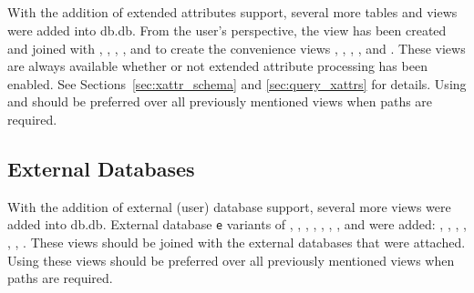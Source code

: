 \subsection{\xattrs}
With the addition of extended attributes support, several more tables
and views were added into db.db. From the user's perspective, the
\xattrs view has been created and joined with \entries, \pentries,
\summary, \vrpentries, and \vrsummary to create the convenience views
\xentries, \xpentries, \xsummary, \vrxpentries, and \vrxsummary. These
views are always available whether or not extended attribute
processing has been enabled. See Sections~\ref{sec:xattr_schema} and
\ref{sec:query_xattrs} for details. Using \vrxpentries and \vrxsummary
should be preferred over all previously mentioned views when paths are
required.

\subsection{External Databases}
With the addition of external (user) database support, several more
views were added into db.db. External database \texttt{e} variants of
\summary, \pentries, \xsummary, \xpentries, \vrsummary, \vrxsummary,
\vrpentries, and \vrxpentries were added: \esummary, \epentries,
\exsummary, \expentries \evrsummary, \evrxsummary, \evrpentries,
\evrxpentries. These views should be joined with the external
databases that were attached. Using these views should be preferred
over all previously mentioned views when paths are required.
